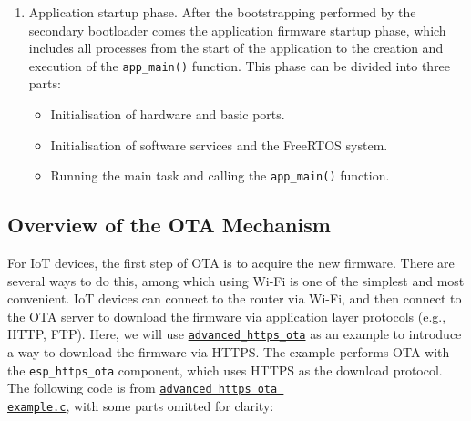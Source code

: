 \documentclass[a4paper,12pt]{book}
\begin{document}
\begin{enumerate}[label=(\arabic*)]
\begin{itemize}[leftmargin=1em]
    \end{itemize}
    \item Application startup phase. After the bootstrapping performed by the secondary bootloader comes the application firmware startup phase, which includes all processes from the start of the application to the creation and execution of the \verb|app_main()| function. This phase can be divided into three parts:
    \begin{itemize}[leftmargin=1em]
        \item Initialisation of hardware and basic ports.
        \item Initialisation of software services and the FreeRTOS system.
        \item Running the main task and calling the \verb|app_main()| function.
    \end{itemize}
\end{enumerate}

\subsection{Overview of the OTA Mechanism}
For IoT devices, the first step of OTA is to acquire the new firmware. There are several ways to do this, among which using Wi-Fi is one of the simplest and most convenient. IoT devices can connect to the router via Wi-Fi, and then connect to the OTA server to download the firmware via application layer protocols (e.g., HTTP, FTP). Here, we will use \href{https://github.com/espressif/esp-idf/tree/master/examples/system/ota/advanced_https_ota}{\texttt{advanced\_https\_ota}} as an example to introduce a way to download the firmware via HTTPS. The example performs OTA with the \verb|esp_https_ota| component, which uses HTTPS as the download protocol. The following code is from \href{https://github.com/espressif/esp-idf/blob/master/examples/system/ota/advanced_https_ota/main/advanced_https_ota_example.c}{\texttt{advanced\_https\_ota\_\\ example.c}}, with some parts omitted for clarity:
\end{document}
